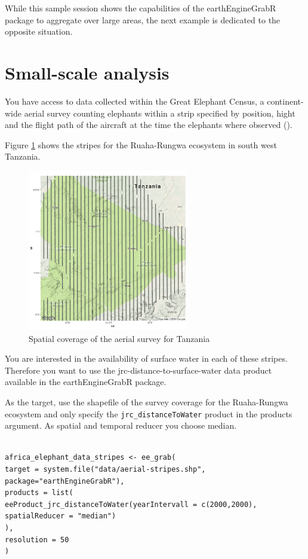 While this sample session shows the capabilities of the earthEngineGrabR package to aggregate over large areas, the next example is dedicated to the opposite situation. 

\section{Small-scale analysis}



You have access to data collected within the Great Elephant Census, a continent-wide aerial survey counting  elephants within a strip specified by position, hight and the flight path of the aircraft at the time the elephants where observed (\cite{beale2017spatial}).

Figure \ref{stripes} shows the stripes for the Ruaha-Rungwa ecosystem in south west Tanzania.

\begin{figure}
	\begin{center}
		\includegraphics[width=7cm]{images/stripes-cropped.pdf}
		\caption{Spatial coverage of the aerial survey for Tanzania}
		\label{stripes}
	\end{center}
\end{figure}


You are interested in the availability of surface water in each of these stripes. Therefore you want to use the jrc-distance-to-surface-water data product available in the earthEngineGrabR package. 

As the target, use the shapefile of the survey coverage for the Ruaha-Rungwa ecosystem and only specify the \texttt{jrc\_distanceToWater} product in the products argument. As spatial and temporal reducer you choose median. 

\begin{lstlisting}

africa_elephant_data_stripes <- ee_grab(
target = system.file("data/aerial-stripes.shp", package="earthEngineGrabR"), 
products = list(
eeProduct_jrc_distanceToWater(yearIntervall = c(2000,2000), spatialReducer = "median")
),
resolution = 50
)
\end{lstlisting}


